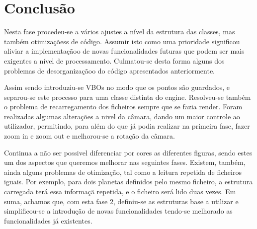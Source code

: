 \chapter{Conclusão}

Nesta fase procedeu-se a vários ajustes a nível da estrutura das classes,
mas também otimizaçõess de código. Assumir isto como uma prioridade significou aliviar a implementaçãoo de novas funcionalidades futuras que podem
ser mais exigentes a nível de processamento. Culmatou-se desta forma alguns
dos problemas de desorganizaçãoo do código apresentados anteriormente.

Assim sendo introduziu-se VBOs no modo que os pontos são guardados,
e separou-se este processo para uma classe distinta do engine. Resolveu-se
também o problema de recarregamento dos ficheiros sempre que se fazia
render.
Foram realizadas algumas alterações a nivel da câmara, dando um maior
controle ao utilizador, permitindo, para além do que já podia realizar na
primeira fase, fazer zoom in e zoom out e melhorou-se a rotação da câmara. 

Continua a não ser possivel diferenciar por cores as diferentes figuras,
sendo estes um dos aspectos que queremos melhorar nas seguintes fases.
Existem, também, ainda alguns problemas de otimização, tal como a leitura
repetida de ficheiros iguais. Por exemplo, para dois planetas definidos
pelo mesmo ficheiro, a estrutura carregada terá essa informaçã repetida, e
o ficheiro será lido duas vezes.
Em suma, achamos que, com esta fase 2, definiu-se as estruturas base
a utilizar e simplificou-se a introdução de novas funcionalidades tendo-se
melhorado as funcionalidades já existentes.
